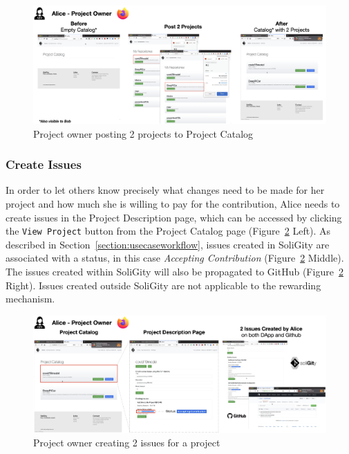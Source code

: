 \documentclass[12pt]{article}
\renewcommand{\_}{\kern-1.5pt\textunderscore\kern-1.5pt}
\begin{document}
\begin{figure}[H]
	\centering
	\includegraphics[width=16cm]{graphs/50. post_1.png}
	\caption{Project owner posting 2 projects to Project Catalog}
	\label{fig:post1}
\end{figure}

\subsubsection{Create Issues}

In order to let others know precisely what changes need to be made for her project and how much she
is willing to pay for the contribution, Alice needs to create issues in the Project Description page,
which can be accessed by clicking the \texttt{View Project} button from the Project Catalog page
(Figure~\ref{fig:post2} Left). As described in Section~\ref{section:usecaseworkflow}, issues created
in SoliGity are associated with a status, in this case \textit{Accepting Contribution} (Figure~\ref{fig:post2} Middle).
The issues created within SoliGity will also be propagated to GitHub (Figure~\ref{fig:post2} Right).
Issues created outside SoliGity are not applicable to the rewarding mechanism.

\begin{figure}[H]
	\centering
	\includegraphics[width=16cm]{graphs/51. post_2.png}
	\caption{Project owner creating 2 issues for a project}
	\label{fig:post2}
\end{figure}
\end{document}
